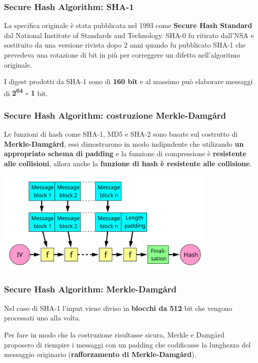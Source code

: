 \begin{frame}
	\frametitle{Secure Hash Algorithm: SHA-1}

	La specifica originale è stata pubblicata nel 1993 come \textbf{Secure Hash Standard} dal National Institute of Standards and Technology.
	SHA-0 fu ritirato dall'NSA e sostituito da una versione rivista dopo 2 anni quando fu pubblicato SHA-1 che prevedeva una rotazione di bit in più
	per correggere un difetto nell'algoritmo originale.

	\vspace{1cm}

	I digest prodotti da SHA-1 sono di \textbf{160 bit} e al massimo può elaborare messaggi di \textbf{2\textsuperscript{64} - 1} bit.
\end{frame}


\begin{frame}
	\frametitle{Secure Hash Algorithm: costruzione Merkle-Damgård}
	Le funzioni di hash come SHA-1, MD5 e SHA-2 sono basate sul costrutto di \textbf{Merkle-Damgård}, essi dimostrarono in modo indipndente
	che utilizando \textbf{un appropriato schema di padding} e la funzione di compressione è \textbf{resistente alle collisioni}, allora anche la \textbf{funzione di hash è resistente alle collisione}.

	\begin{center}
		\includegraphics[width=0.8\textwidth]{img/1-img/Merkle-Damgard.png}
	\end{center}
\end{frame}


\begin{frame}
	\frametitle{Secure Hash Algorithm: Merkle-Damgård}

	Nel caso di SHA-1 l'input viene diviso in \textbf{blocchi da 512} bit che vengono processati uno alla volta.

	\vspace{1cm}


	Per fare in modo che la costruzione risultasse sicura, Merkle e Damgård proposero di
	riempire i messaggi con un padding che codificasse la lunghezza del messaggio originario (\textbf{rafforzamento di Merkle-Damgård}).
\end{frame}


